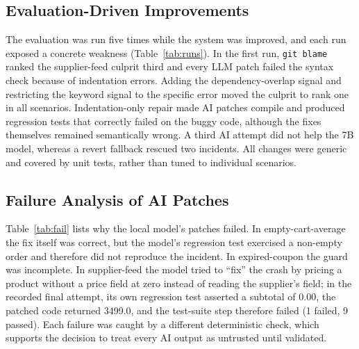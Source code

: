 \documentclass[conference]{IEEEtran}
\begin{document}
\subsection{Evaluation-Driven Improvements}
The evaluation was run five times while the system was improved, and each run exposed a concrete weakness (Table~\ref{tab:runs}). In the first run, \texttt{git blame} ranked the supplier-feed culprit third and every LLM patch failed the syntax check because of indentation errors. Adding the dependency-overlap signal and restricting the keyword signal to the specific error moved the culprit to rank one in all scenarios. Indentation-only repair made AI patches compile and produced regression tests that correctly failed on the buggy code, although the fixes themselves remained semantically wrong. A third AI attempt did not help the 7B model, whereas a revert fallback rescued two incidents. All changes were generic and covered by unit tests, rather than tuned to individual scenarios.

\begin{table}[t]
\centering
\caption{Evaluation-driven improvements (gate = reached approval gate or correctly silent; RCA = diagnosis names culprit)}
\label{tab:runs}
\end{table}

\subsection{Failure Analysis of AI Patches}
Table~\ref{tab:fail} lists why the local model's patches failed. In empty-cart-average the fix itself was correct, but the model's regression test exercised a non-empty order and therefore did not reproduce the incident. In expired-coupon the guard was incomplete. In supplier-feed the model tried to ``fix'' the crash by pricing a product without a price field at zero instead of reading the supplier's field; in the recorded final attempt, its own regression test asserted a subtotal of 0.00, the patched code returned 3499.0, and the test-suite step therefore failed (1 failed, 9 passed). Each failure was caught by a different deterministic check, which supports the decision to treat every AI output as untrusted until validated.
\end{document}
